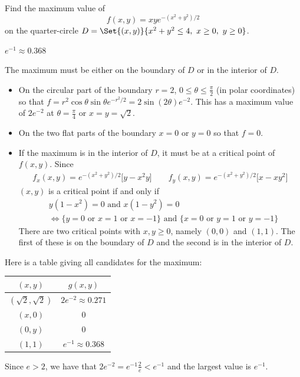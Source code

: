 \begin{question}[M200 2000A] %
Find the maximum value of 
\begin{equation*}
f(x, y) = xye^{-(x^2 + y^2) / 2}
\end{equation*}
on the quarter-circle $D = \Set{(x, y)} { x^2 + y^2 \le 4,\ x\ge0,\ y\ge 0}$.
\end{question}

%

\begin{answer}
$e^{-1}\approx0.368$
\end{answer}

\begin{solution}
The maximum must be either on the boundary of $D$ or in the interior of $D$.
\begin{itemize} 
\item On the circular part of the boundary $r=2$, 
      $0\le\theta\le\frac{\pi}{2}$ (in polar coordinates) so that 
$f=r^2\cos\theta\sin\theta e^{-r^2/2}=2\sin(2\theta)e^{-2}$. This has a maximum value 
of $2e^{-2}$ at $\theta=\frac{\pi}{4}$ or $x=y=\sqrt{2}$.
\item 
On the two flat parts of the boundary $x=0$ or $y=0$ so that $f=0$.  
\item
 If the maximum is in the interior of $D$,
it must be at a critical point of $f(x,y)$. Since
\begin{align*}
f_x(x,y)=e^{-(x^2 + y^2) / 2}\big[y-x^2y\big]\qquad
f_y(x,y)=e^{-(x^2 + y^2) / 2}\big[x-xy^2\big]
\end{align*}
$(x,y)$ is a critical point if and only if
\begin{align*}
&y(1-x^2)=0\text{ and }x(1-y^2)=0 \\
&\iff \{y=0\text{ or }x=1\text{ or }x=-1\}\text{ and }
       \{x=0\text{ or }y=1\text{ or }y=-1\}
\end{align*}
There are two critical points with $x,y\ge 0$, namely $(0,0)$ and $(1,1)$. 
The first of these is on the boundary of $D$ and the second is in the 
interior of $D$.
\end{itemize}
Here is a table giving all candidates for the maximum:
\begin{center}
\renewcommand{\arraystretch}{1.3}
     \begin{tabular}{|c|c|}
     \hline
       $(x,y)$  & $g(x,y)$ \\ \hline
       $(\sqrt{2},\sqrt{2})$ & $2e^{-2}\approx0.271$ \\ \hline
       $(x,0)$ & $0$ \\ \hline
       $(0,y)$ & $0$ \\ \hline
       $(1,1)$ & $e^{-1}\approx0.368$ \\ \hline
     \end{tabular}
\renewcommand{\arraystretch}{1.0}
\end{center}
Since $e>2$, we have that $2e^{-2}=e^{-1}\frac{2}{e}<e^{-1}$ and
the largest value is $e^{-1}$.
\end{solution}

